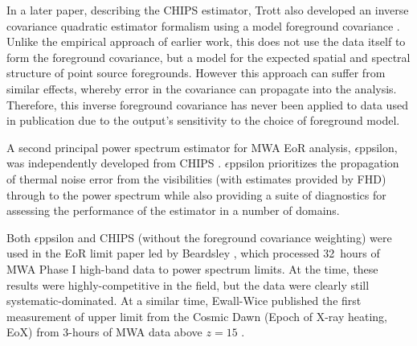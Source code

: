 In a later paper, describing the CHIPS estimator, Trott also developed an inverse covariance quadratic estimator formalism using a model foreground covariance \cite{trottchips2016}. Unlike the empirical approach of earlier work, this does not use the data itself to form the foreground covariance, but a model for the expected spatial and spectral structure of point source foregrounds. However this approach can suffer from similar effects, whereby error in the covariance can propagate into the analysis. Therefore, this inverse foreground covariance has never been applied to data used in publication due to the output's sensitivity to the choice of foreground model.

A second principal power spectrum estimator for MWA EoR analysis, $\epsilon$ppsilon, was independently developed from CHIPS \cite{barry19}. $\epsilon$ppsilon prioritizes the propagation of thermal noise error from the visibilities (with estimates provided by FHD) through to the power spectrum while also providing a suite of diagnostics for assessing the performance of the estimator in a number of domains.  

Both $\epsilon$ppsilon and CHIPS (without the foreground covariance weighting) were used in the EoR limit paper led by Beardsley \cite{beardsley16}, which processed 32~hours of MWA Phase I high-band data to power spectrum limits. 
At the time, these results were highly-competitive in the field, but the data were clearly still systematic-dominated. At a similar time, Ewall-Wice published the first measurement of upper limit from the Cosmic Dawn (Epoch of X-ray heating, EoX) from 3-hours of MWA data above $z=15$ \cite{ewall-wice16}.


